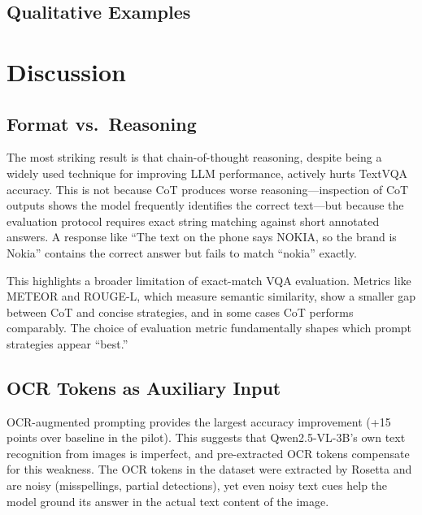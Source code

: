 \documentclass[11pt]{article}
\begin{document}
\subsection{Qualitative Examples}



\section{Discussion}

\subsection{Format vs.\ Reasoning}

The most striking result is that chain-of-thought reasoning, despite being a widely used technique for improving LLM performance, actively hurts TextVQA accuracy. This is not because CoT produces worse reasoning---inspection of CoT outputs shows the model frequently identifies the correct text---but because the evaluation protocol requires exact string matching against short annotated answers. A response like ``The text on the phone says NOKIA, so the brand is Nokia'' contains the correct answer but fails to match ``nokia'' exactly.

This highlights a broader limitation of exact-match VQA evaluation. Metrics like METEOR and ROUGE-L, which measure semantic similarity, show a smaller gap between CoT and concise strategies, and in some cases CoT performs comparably. The choice of evaluation metric fundamentally shapes which prompt strategies appear ``best.''

\subsection{OCR Tokens as Auxiliary Input}

OCR-augmented prompting provides the largest accuracy improvement (+15 points over baseline in the pilot). This suggests that Qwen2.5-VL-3B's own text recognition from images is imperfect, and pre-extracted OCR tokens compensate for this weakness. The OCR tokens in the dataset were extracted by Rosetta \citep{borisyuk2018rosetta} and are noisy (misspellings, partial detections), yet even noisy text cues help the model ground its answer in the actual text content of the image.
\end{document}

